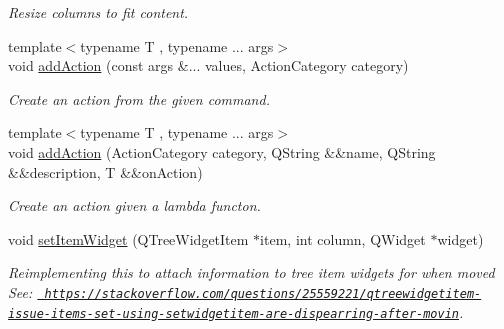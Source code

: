 \begin{Indent}
\begin{DoxyCompactItemize}
\begin{DoxyCompactList}\small\item\em Resize columns to fit content. \end{DoxyCompactList}\item 
\mbox{\label{classrev_1_1_view_1_1_tree_widget_ae975601da770e3c94478d2ee7f7c3714}} 
{\footnotesize template$<$typename T , typename ... args$>$ }\\void \mbox{\hyperlink{classrev_1_1_view_1_1_tree_widget_ae975601da770e3c94478d2ee7f7c3714}{add\+Action}} (const args \&... values, Action\+Category category)
\begin{DoxyCompactList}\small\item\em Create an action from the given command. \end{DoxyCompactList}\item 
\mbox{\label{classrev_1_1_view_1_1_tree_widget_a96b16b4e2fb4961f1c0ec43d94f36eb6}} 
{\footnotesize template$<$typename T , typename ... args$>$ }\\void \mbox{\hyperlink{classrev_1_1_view_1_1_tree_widget_a96b16b4e2fb4961f1c0ec43d94f36eb6}{add\+Action}} (Action\+Category category, Q\+String \&\&name, Q\+String \&\&description, T \&\&on\+Action)
\begin{DoxyCompactList}\small\item\em Create an action given a lambda functon. \end{DoxyCompactList}\item 
\mbox{\label{classrev_1_1_view_1_1_tree_widget_a1483d49c8b7125159557e2434fa2b90e}} 
void \mbox{\hyperlink{classrev_1_1_view_1_1_tree_widget_a1483d49c8b7125159557e2434fa2b90e}{set\+Item\+Widget}} (Q\+Tree\+Widget\+Item $\ast$item, int column, Q\+Widget $\ast$widget)
\begin{DoxyCompactList}\small\item\em Reimplementing this to attach information to tree item widgets for when moved See\+: \href{https://stackoverflow.com/questions/25559221/qtreewidgetitem-issue-items-set-using-setwidgetitem-are-dispearring-after-movin}{\texttt{ https\+://stackoverflow.\+com/questions/25559221/qtreewidgetitem-\/issue-\/items-\/set-\/using-\/setwidgetitem-\/are-\/dispearring-\/after-\/movin}}. \end{DoxyCompactList}\end{DoxyCompactItemize}
\end{Indent}

